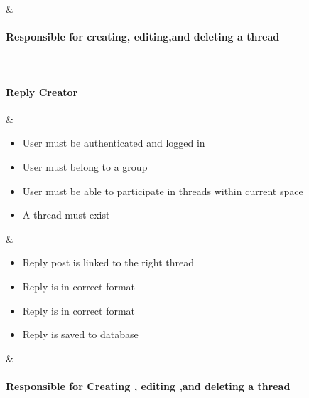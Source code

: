 \documentclass{article}
\begin{document}
\begin{table}
\begin{tabularx}{\textwidth}
\begin{itemize}
\end{itemize} &
	\paragraph{Responsible for creating, editing,and deleting a thread}
\\
\hline
	\paragraph{Reply Creator}
	&
	\begin{itemize}
\item	User  must be authenticated and  logged in
\item	User must belong to a group
\item	User must be able to participate in threads within current space
\item	A thread must exist
	
		
		
	\end{itemize} &
	\begin{itemize}
\item Reply post is linked to the right thread
\item Reply is in correct format
\item Reply is in correct format
\item Reply is saved to database

	\end{itemize} &
	\paragraph{Responsible for Creating , editing ,and deleting a thread}
	\\
	\hline
\end{tabularx}
\end{table}
\end{document}
